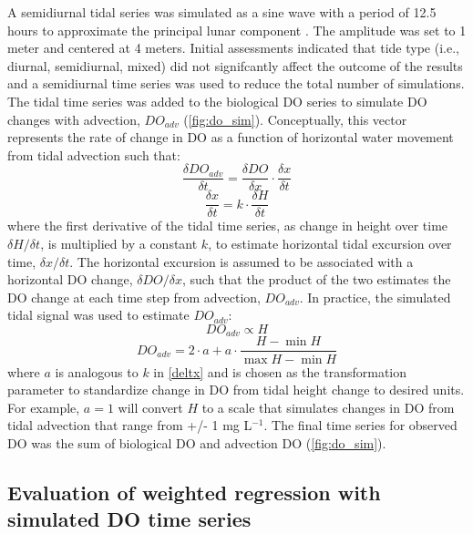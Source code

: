 \documentclass[letterpaper,12pt,oneside]{article}\usepackage[]{graphicx}\usepackage[]{color}
\begin{document}
A semidiurnal tidal series was simulated as a sine wave with a period of 12.5 hours to approximate the principal lunar component \citep{Foreman89}.  The amplitude was set to 1 meter and centered  at 4 meters.  Initial assessments indicated that tide type (i.e., diurnal, semidiurnal, mixed) did not signifcantly affect the outcome of the results and a semidiurnal time series was used to reduce the total number of simulations.  The tidal time series was added to the biological \ac{DO} series to simulate \ac{DO} changes with advection, $DO_{adv}$ (\cref{fig:do_sim}). Conceptually, this vector represents the rate of change in \ac{DO} as a function of horizontal water movement from tidal advection such that:
\begin{equation} \label{deltdo}
\frac{\delta DO_{adv}}{\delta t} = \frac{\delta DO}{\delta x} \cdot \frac{\delta x}{\delta t}
\end{equation}
\begin{equation} \label{deltx}
\frac{\delta x}{\delta t} = k \cdot \frac{\delta H}{\delta t}
\end{equation}
where the first derivative of the tidal time series, as change in height over time $\delta H / \delta t$, is multiplied by a constant $k$, to estimate horizontal tidal excursion over time, $\delta x / \delta t$.  The horizontal excursion is assumed to be associated with a horizontal \ac{DO} change, $\delta DO / \delta x$, such that the product of the two estimates the \ac{DO} change at each time step from advection, $DO_{adv}$. In practice, the simulated tidal signal was used to estimate $DO_{adv}$:
\begin{equation} \label{do_advp}
DO_{adv} \propto H
\end{equation}
\begin{equation} \label{do_adv}
DO_{adv} = 2\cdot a + a \cdot \frac{H- \min H}{\max H - \min H}
\end{equation}
where $a$ is analogous to $k$ in \cref{deltx} and is chosen as the transformation parameter to standardize change in \ac{DO} from tidal height change to desired units.  For example, $a = 1$ will convert $H$ to a scale that simulates changes in \ac{DO} from tidal advection that range from +/- 1 mg L$^{-1}$.  The final time series for observed \ac{DO} was the sum of biological \ac{DO} and advection \ac{DO} (\cref{fig:do_sim}).

\subsection{Evaluation of weighted regression with simulated \ac{DO} time series}
\end{document}
